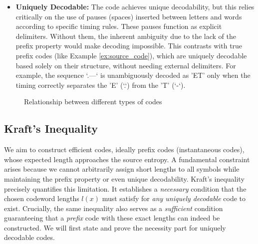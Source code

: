 \begin{example}
\begin{itemize}
        \item \textbf{Uniquely Decodable:} The code achieves unique decodability, but this relies critically on the use of pauses (spaces) inserted between letters and words according to specific timing rules. These pauses function as explicit delimiters. Without them, the inherent ambiguity due to the lack of the prefix property would make decoding impossible. This contrasts with true prefix codes (like Example \ref{ex:source_code}), which are uniquely decodable based solely on their structure, without needing external delimiters. For example, the sequence `.---` is unambiguously decoded as 'ET' only when the timing correctly separates the 'E' (`.`) from the 'T' (`-`).
    \end{itemize}
\end{example}

\begin{figure}[h]
    \centering
    \caption{Relationship between different types of codes \label{fig:codes}}
\end{figure}

\subsection{Kraft's Inequality}

We aim to construct efficient codes, ideally prefix codes (instantaneous codes), whose expected length approaches the source entropy. A fundamental constraint arises because we cannot arbitrarily assign short lengths to all symbols while maintaining the prefix property or even unique decodability. Kraft's inequality precisely quantifies this limitation. It establishes a \emph{necessary} condition that the chosen codeword lengths $l(x)$ must satisfy for \emph{any uniquely decodable} code to exist. Crucially, the same inequality also serves as a \emph{sufficient} condition guaranteeing that a \emph{prefix} code with these exact lengths can indeed be constructed. We will first state and prove the necessity part for uniquely decodable codes.


